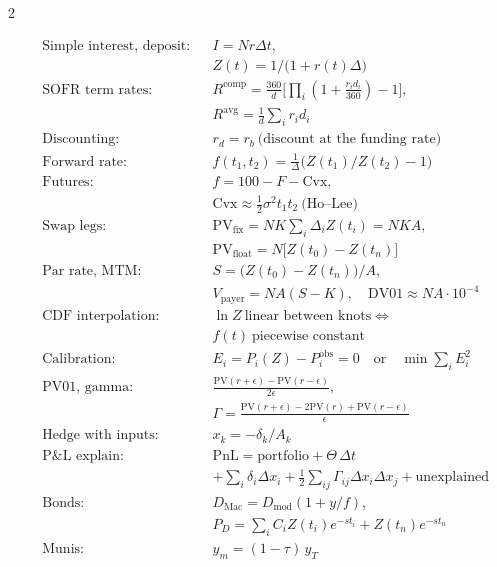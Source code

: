 \begin{paracol}{2}
\begin{keyformulas}
\begin{align*}
&\text{Simple interest, deposit:} && I=Nr\Delta t,\\
& && Z(t)=1/\bigl(1+r(t)\Delta\bigr)\\
&\text{SOFR term rates:} && R^{\mathrm{comp}}=\tfrac{360}{d}\bigl[\textstyle\prod_i(1+\tfrac{r_id_i}{360})-1\bigr],\\
& && R^{\mathrm{avg}}=\tfrac1d\sum_ir_id_i\\
&\text{Discounting:} && r_d=r_b\ \text{(discount at the funding rate)}\\
&\text{Forward rate:} && f(t_1,t_2)=\tfrac1\Delta\bigl(Z(t_1)/Z(t_2)-1\bigr)\\
&\text{Futures:} && f=100-F-\mathrm{Cvx},\\
& && \mathrm{Cvx}\approx\tfrac12\sigma^2t_1t_2\ \text{(Ho--Lee)}\\
&\text{Swap legs:} && \mathrm{PV}_{\mathrm{fix}}=NK\textstyle\sum_i\Delta_iZ(t_i)=NKA,\\
& && \mathrm{PV}_{\mathrm{float}}=N\bigl[Z(t_0)-Z(t_n)\bigr]\\
&\text{Par rate, MTM:} && S=\bigl(Z(t_0)-Z(t_n)\bigr)/A,\\
& && V_{\mathrm{payer}}=NA(S-K),\quad \mathrm{DV01}\approx NA\cdot10^{-4}\\
&\text{CDF interpolation:} && \ln Z\ \text{linear between knots}\iff\\
& && f(t)\ \text{piecewise constant}\\
&\text{Calibration:} && E_i=P_i(Z)-P_i^{\mathrm{obs}}=0\quad\text{or}\quad\min\textstyle\sum_iE_i^2\\
&\text{PV01, gamma:} && \tfrac{\mathrm{PV}(r+\epsilon)-\mathrm{PV}(r-\epsilon)}{2\epsilon},\\
& && \Gamma=\tfrac{\mathrm{PV}(r+\epsilon)-2\mathrm{PV}(r)+\mathrm{PV}(r-\epsilon)}{\epsilon}\\
&\text{Hedge with inputs:} && x_k=-\delta_k/A_k\\
&\text{P\&L explain:} && \mathrm{PnL}=\text{portfolio}+\Theta\,\Delta t\\
& && +\textstyle\sum_i\delta_i\Delta x_i+\tfrac12\sum_{ij}\Gamma_{ij}\Delta x_i\Delta x_j+\text{unexplained}\\
&\text{Bonds:} && D_{\mathrm{Mac}}=D_{\mathrm{mod}}(1+y/f),\\
& && P_D=\textstyle\sum_iC_iZ(t_i)e^{-st_i}+Z(t_n)e^{-st_n}\\
&\text{Munis:} && y_m=(1-\tau)\,y_T
\end{align*}
\end{keyformulas}


\end{paracol}
